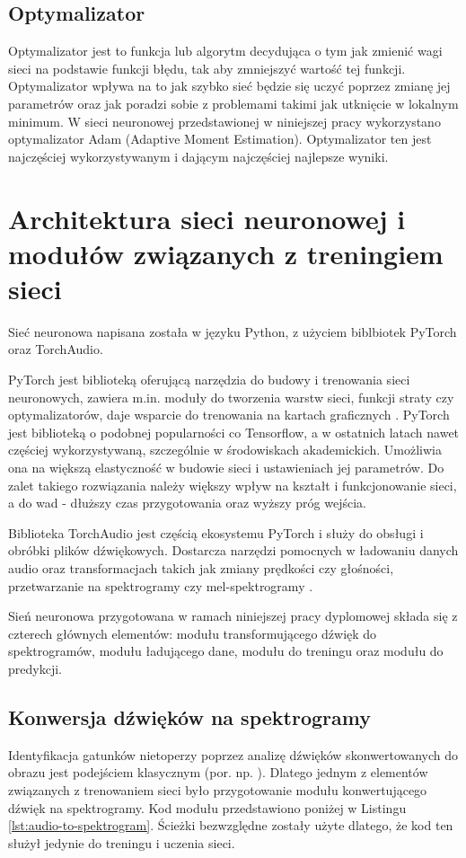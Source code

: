 \documentclass{sprz}
\begin{document}
\subsection{Optymalizator}
Optymalizator jest to funkcja lub algorytm decydująca o tym jak zmienić wagi sieci na podstawie funkcji błędu, tak aby zmniejszyć wartość tej funkcji. Optymalizator wpływa na to jak szybko sieć będzie się uczyć poprzez zmianę jej parametrów oraz jak poradzi sobie z problemami takimi jak utknięcie w lokalnym minimum. W sieci neuronowej przedstawionej w niniejszej pracy wykorzystano optymalizator Adam (Adaptive Moment Estimation). Optymalizator ten jest najczęściej wykorzystywanym i dającym najczęściej najlepsze wyniki.

\section{Architektura sieci neuronowej i modułów związanych z treningiem sieci}
Sieć neuronowa napisana została w języku Python, z użyciem biblbiotek PyTorch oraz TorchAudio. 

PyTorch jest biblioteką oferującą narzędzia do budowy i trenowania sieci neuronowych, zawiera m.in. moduły do tworzenia warstw sieci, funkcji straty czy optymalizatorów, daje wsparcie do trenowania na kartach graficznych \cite{pytorch}.
PyTorch jest biblioteką o podobnej popularności co Tensorflow, a w ostatnich latach nawet częściej wykorzystywaną, szczególnie w środowiskach akademickich. Umożliwia ona na większą elastyczność w budowie sieci i ustawieniach jej parametrów. Do zalet takiego rozwiązania należy większy wpływ na kształt i funkcjonowanie sieci, a do wad - dłuższy czas przygotowania oraz wyższy próg wejścia. 

Biblioteka TorchAudio jest częścią ekosystemu PyTorch i służy do obsługi i obróbki plików dźwiękowych. Dostarcza narzędzi pomocnych w ładowaniu danych audio oraz transformacjach takich jak zmiany prędkości czy głośności, przetwarzanie na spektrogramy czy mel-spektrogramy \cite{torchaudio}. 

Sień neuronowa przygotowana w ramach niniejszej pracy dyplomowej składa się z czterech głównych elementów: modułu transformującego dźwięk do spektrogramów, modułu ładującego dane, modułu do treningu oraz modułu do predykcji.

\subsection{Konwersja dźwięków na spektrogramy}
Identyfikacja gatunków nietoperzy poprzez analizę dźwięków skonwertowanych do obrazu jest podejściem klasycznym (por. np. \cite{bats-id-dl2020b}). Dlatego jednym z elementów związanych z trenowaniem sieci było przygotowanie modułu konwertującego dźwięk na spektrogramy. Kod modułu przedstawiono poniżej w Listingu \ref{lst:audio-to-spektrogram}. Ścieżki bezwzględne zostały użyte dlatego, że kod ten służył jedynie do treningu i uczenia sieci.
\end{document}
